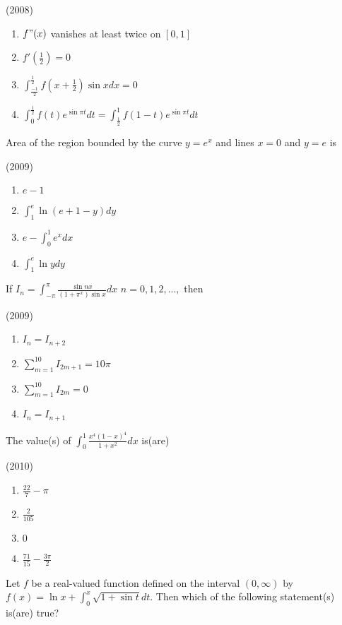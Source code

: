		\hfill{(2008)}
		\begin{enumerate}
			\item $f"(x)$ vanishes at least twice on $[0,1]$
			\item $f'(\frac{1}{2})=0$
			\item $\int_{\frac{-1}{2}}^{\frac{1}{2}}f(x+\frac{1}{2})\sin xdx=0$
			\item $\int_{0}^{\frac{1}{2}}f(t)e^{\sin \pi{t}}dt=\int_{\frac{1}{2}}^{1}f(1-t)e^{\sin \pi{t}}dt$
		\end{enumerate}
	\item
		Area of the region bounded by the curve $y=e^x$ and lines $x=0$ and $y=e$ is

		\hfill{(2009)}
		\begin{multicols}{2}
		\begin{enumerate}
			\item $e-1$
			\item $\int_{1}^{e}\ln (e+1-y)dy$
			\item $e-\int_{0}^{1}e^xdx$
			\item $\int_{1}^{e}\ln ydy$
		\end{enumerate}
			\end{multicols}
	\item 
		If $I_n=\int_{-\pi}^{\pi}\frac{\sin{nx}}{(1+{\pi}^x)\sin x}dx$ $n=0,1,2, ...,$ then

		\hfill{(2009)}
		\begin{multicols}{2}
		\begin{enumerate}
			\item $I_{n}=I_{n+2}$
			\item $\sum_{m=1}^{10}I_{2m+1}=10\pi$
			\item $\sum_{m=1}^{10}I_{2m}=0$
			\item $I_{n}=I_{n+1}$
		\end{enumerate}
			\end{multicols}
	\item 
		The value(s) of $\int_{0}^{1}\frac{x^4(1-x)^4}{1+x^2}dx$ is(are)

		\hfill{(2010)}
		\begin{multicols}{2}
		\begin{enumerate}
			\item  $\frac{22}{7}-\pi$
			\item $\frac{2}{105}$
			\item $0$
			\item $\frac{71}{15}-\frac{3\pi}{2}$
		\end{enumerate}
			\end{multicols}
	\item 
		Let $f$ be a real-valued function defined on the interval $(0,\infty)$ by $f(x)=\ln x+\int_{0}^{x}\sqrt{1+\sin t}dt$. Then which of the following statement(s) is(are) true?

